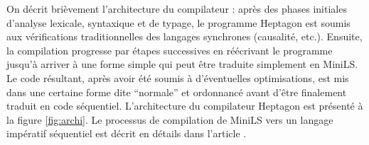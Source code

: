 \documentclass[a4paper]{article}
\newcommand{\LANG}{Heptagon}
\begin{document}
On d\'ecrit bri\`evement l'architecture du compilateur : apr\`es des phases initiales
d'analyse lexicale, syntaxique et de typage, le programme \LANG{} est soumis aux
v\'erifications traditionnelles des langages synchrones (causalit\'e,
etc.). Ensuite, la compilation progresse par étapes successives en réécrivant le programme jusqu'\`a arriver \`a une forme simple qui
peut \^etre traduite simplement en MiniLS. Le code r\'esultant, apr\`es avoir \'et\'e
soumis \`a d'\'eventuelles optimisations, est mis dans une certaine forme dite
``normale'' et ordonnanc\'e avant d'\^etre finalement traduit en code
s\'equentiel. L'architecture du compilateur \LANG{} est pr\'esent\'e \`a la figure
\ref{fig:archi}. Le processus de compilation de MiniLS vers un langage impératif séquentiel est
d\'ecrit en d\'etails dans l'article \cite{lctes08a}.

\end{document}
